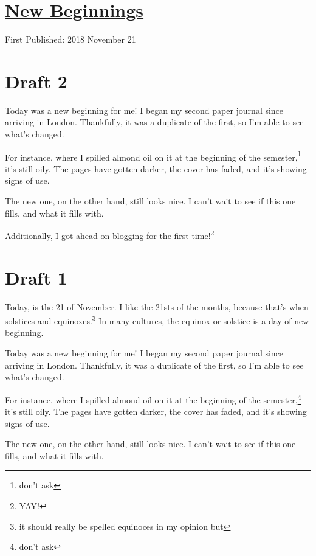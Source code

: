 \documentclass[12pt]{article}[titlepage]
\newcommand{\1}{\={a}}
\newcommand{\2}{\={e}}
\newcommand{\3}{\={\i}}
\newcommand{\4}{\=o}
\newcommand{\5}{\=u}
\newcommand{\6}{\={A}}
\renewcommand{\,}{\textsuperscript{,}}
\begin{document}
\doublespacing
\section{\href{new-beginnings.html}{New Beginnings}}
First Published: 2018 November 21
\section{Draft 2}
Today was a new beginning for me!
I began my second paper journal since arriving in London.
Thankfully, it was a duplicate of the first, so I'm able to see what's changed.

For instance, where I spilled almond oil on it at the beginning of the semester,\footnote{don't ask} it's still oily.
The pages have gotten darker, the cover has faded, and it's showing signs of use.

The new one, on the other hand, still looks nice.
I can't wait to see if this one fills, and what it fills with.

Additionally, I got ahead on blogging for the first time!\footnote{YAY!}

\section{Draft 1}
Today, is the 21 of November.
I like the 21sts of the months, because that's when solstices and equinoxes.\footnote{it should really be spelled equinoces in my opinion but}
In many cultures, the equinox or solstice is a day of new beginning.

Today was a new beginning for me!
I began my second paper journal since arriving in London.
Thankfully, it was a duplicate of the first, so I'm able to see what's changed.

For instance, where I spilled almond oil on it at the beginning of the semester,\footnote{don't ask} it's still oily.
The pages have gotten darker, the cover has faded, and it's showing signs of use.

The new one, on the other hand, still looks nice.
I can't wait to see if this one fills, and what it fills with.
\end{document}
